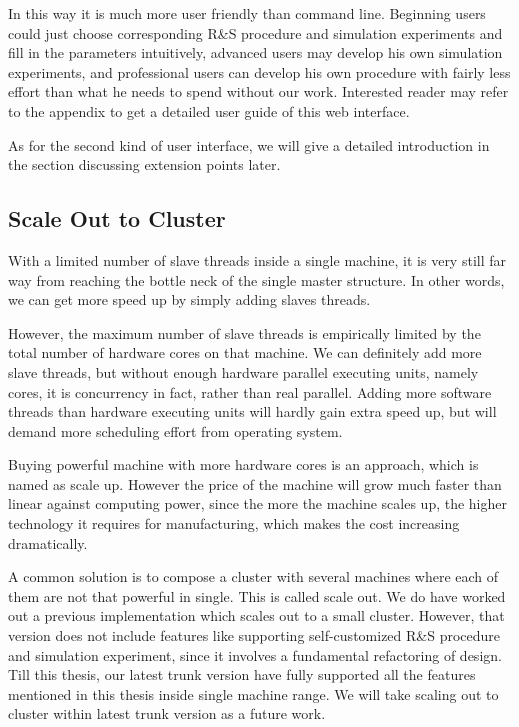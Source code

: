 \documentclass[12pt,a4paper]{report}
\begin{document}
In this way it is much more user friendly than command line. Beginning users could just choose corresponding R\&S procedure and simulation experiments and fill in the parameters intuitively, advanced users may develop his own simulation experiments, and professional users can develop his own procedure with fairly less effort than what he needs to spend without our work. Interested reader may refer to the appendix to get a detailed user guide of this web interface.

As for the second kind of user interface, we will give a detailed introduction in the section discussing extension points later.

\subsection{Scale Out to Cluster}

With a limited number of slave threads inside a single machine, it is very still far way from reaching the bottle neck of the single master structure. In other words, we can get more speed up by simply adding slaves threads.

However, the maximum number of slave threads is empirically limited by the total number of hardware cores on that machine. We can definitely add more slave threads, but without enough hardware parallel executing units, namely cores, it is concurrency in fact, rather than real parallel. Adding more software threads than hardware executing units will hardly gain extra speed up, but will demand more scheduling effort from operating system.

Buying powerful machine with more hardware cores is an approach, which is named as scale up. However the price of the machine will grow much faster than linear against computing power, since the more the machine scales up, the higher technology it requires for manufacturing, which makes the cost increasing dramatically.

A common solution is to compose a cluster with several machines where each of them are not that powerful in single. This is called scale out. We do have worked out a previous implementation which scales out to a small cluster. However, that version does not include features like supporting self-customized R\&S procedure and simulation experiment, since it involves a fundamental refactoring of design. Till this thesis, our latest trunk version have fully supported all the features mentioned in this thesis inside single machine range. We will take scaling out to cluster within latest trunk version as a future work.
\end{document}
